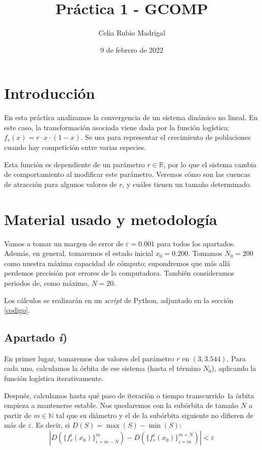 \documentclass[a4paper]{article}
\author{Celia Rubio Madrigal}
\title{Práctica 1 - GCOMP}
\date{9 de febrero de 2022}
\begin{document}
	\maketitle
	
	\tableofcontents
	
	\newpage
	
	\section{Introducción}
	En esta práctica analizamos la convergencia de un sistema dinámico no lineal. En este caso, la transformación asociada viene dada por la función logística: $f_r(x) = r\cdot x\cdot(1-x)$.
	Se usa para representar el crecimiento de poblaciones cuando hay competición entre varias especies. 
	
	Esta función es dependiente de un parámetro $r\in\mathbb{R}$, por lo que el sistema cambia de comportamiento al modificar este parámetro. Veremos cómo son las cuencas de atracción para algunos valores de $r$, y cuáles tienen un tamaño determinado.
	
	\section{Material usado y metodología}
	Vamos a tomar un margen de error de $\varepsilon=0.001$ para todos los apartados. Además, en general, tomaremos el estado inicial $x_0=0.200$. 
	Tomamos $N_0=200$ como nuestra máxima capacidad de cómputo; supondremos que más allá perdemos precisión por errores de la computadora. También consideramos periodos de, como máximo, $N=20$.
	
	Los cálculos se realizarán en un \textit{script} de Python, adjuntado en la sección \ref{codigo}.
	
	\subsection{Apartado \textit{i})}
	
	En primer lugar, tomaremos dos valores del parámetro $r$ en $(3,3.544)$. Para cada uno, calculamos la órbita de ese sistema (hasta el término $N_0$), aplicando la función logística iterativamente. 
	
	Después, calculamos hasta qué paso de iteración \textemdash o tiempo transcurrido\textemdash~la órbita empieza a mantenerse estable. Nos quedaremos con la subórbita de tamaño $N$ a partir de $m\in\mathbb{N}$ tal que su diámetro y el de la subórbita siguiente no difieren de más de $\varepsilon$. Es decir, si $D(S)=\max(S)-\min(S)$:
	\[ \left|D\left(\{f_r^i(x_0)\}_{i=m-N}^{m}\right) - D\left(\{f_r^i(x_0)\}_{i=m}^{m+N}\right)\right| < \varepsilon \]
	
\end{document}
